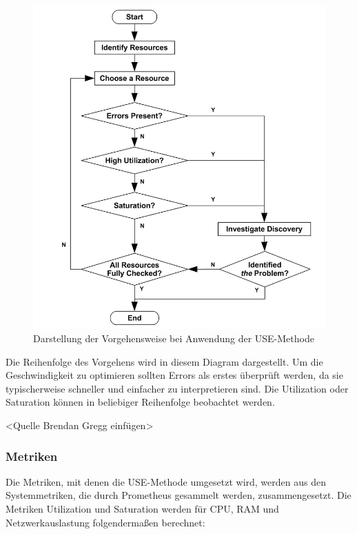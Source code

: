 \documentclass[a4paper,10pt]{scrartcl}
\begin{document}
\begin{figure}[htbp]
\includegraphics[scale=.7]{img/usemethod_flow.png}
\caption{Darstellung der Vorgehensweise bei Anwendung der USE-Methode}
\end{figure}

Die Reihenfolge des Vorgehens wird in diesem Diagram dargestellt. Um die Geschwindigkeit zu optimieren sollten Errors als erstes überprüft werden, da sie typischerweise schneller und einfacher zu interpretieren sind. Die Utilization oder Saturation können in beliebiger Reihenfolge beobachtet werden.

<Quelle Brendan Gregg einfügen>
\pagebreak

\subsubsection{Metriken}

Die Metriken, mit denen die USE-Methode umgesetzt wird, werden aus den Systemmetriken, die durch Prometheus gesammelt werden, zusammengesetzt. 
Die Metriken Utilization und Saturation werden für CPU, RAM und Netzwerkauslastung folgendermaßen berechnet:
\end{document}
